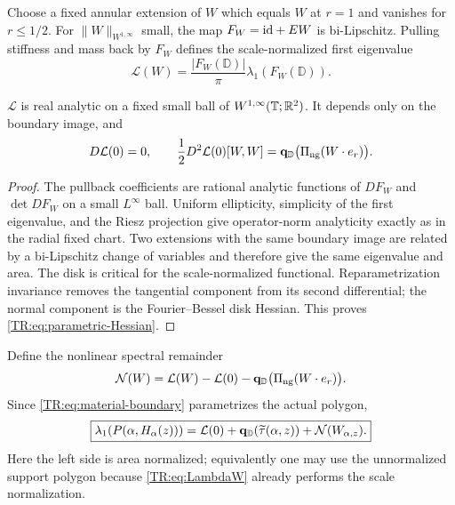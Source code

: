 Choose a fixed annular extension of $W$ which equals $W$ at $r=1$ and
vanishes for $r\le1/2$.  For $\|W\|_{W^{1,\infty}}$ small, the map
$F_W={\rm id}+EW$ is bi-Lipschitz.  Pulling stiffness and mass back by
$F_W$ defines the scale-normalized first eigenvalue
\begin{equation}\label{TR:eq:LambdaW}
 \mathcal L(W)=\frac{|F_W(\mathbb D)|}{\pi}
 \lambda_1(F_W(\mathbb D)).
\end{equation}

\begin{lemma}
\label{TR:lem:parametric-analytic}
$\mathcal L$ is real analytic on a fixed small ball of
$W^{1,\infty}(\mathbb T;\mathbb R^2)$.  It depends only on the boundary image,
and
\begin{equation}\label{TR:eq:parametric-Hessian}
 D\mathcal L(0)=0,
 \qquad
 \frac12D^2\mathcal L(0)[W,W]
 =\mathbf q_{\mathbb D}\bigl(\Pi_{\rm ng}(W\cdot e_r)\bigr).
\end{equation}
\end{lemma}

\begin{proof}
The pullback coefficients are rational analytic functions of $DF_W$ and
$\det DF_W$ on a small $L^\infty$ ball.  Uniform ellipticity, simplicity
of the first eigenvalue, and the Riesz projection give operator-norm
analyticity exactly as in the radial fixed chart.  Two extensions with the
same boundary image are related by a bi-Lipschitz change of variables and
therefore give the same eigenvalue and area.  The disk is critical for the
scale-normalized functional.  Reparametrization invariance removes the
tangential component from its second differential; the normal component
is the Fourier--Bessel disk Hessian.  This proves
\eqref{TR:eq:parametric-Hessian}.
\end{proof}

Define the nonlinear spectral remainder
\begin{equation}\label{TR:eq:N}
 \mathcal N(W)=\mathcal L(W)-\mathcal L(0)
 -\mathbf q_{\mathbb D}\bigl(\Pi_{\rm ng}(W\cdot e_r)\bigr).
\end{equation}
Since \eqref{TR:eq:material-boundary} parametrizes the actual polygon,
\begin{equation}\label{TR:eq:exact-value-split}
 \boxed{
 \lambda_1(P(\alpha,H_\alpha(z)))
 =\mathcal L(0)+\mathbf q_{\mathbb D}(\widetilde\tau(\alpha,z))
  +\mathcal N(W_{\alpha,z}).}
\end{equation}
Here the left side is area normalized; equivalently one may use the
unnormalized support polygon because \eqref{TR:eq:LambdaW} already performs
the scale normalization.
\endgroup
